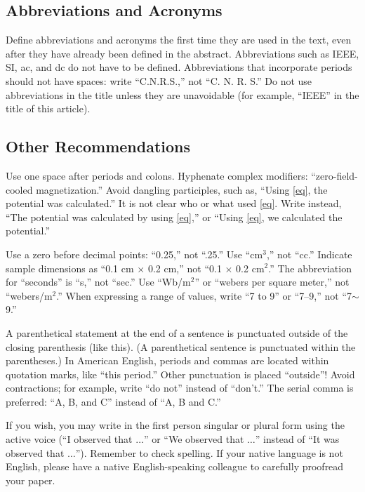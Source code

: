 \documentclass[journal,twoside,web]{ieeecolor}
\begin{document}
\subsection{Abbreviations and Acronyms}
Define abbreviations and acronyms the first time they are used in the text,
even after they have already been defined in the abstract. Abbreviations
such as IEEE, SI, ac, and dc do not have to be defined. Abbreviations that
incorporate periods should not have spaces: write ``C.N.R.S.,'' not ``C. N.
R. S.'' Do not use abbreviations in the title unless they are unavoidable
(for example, ``IEEE'' in the title of this article).

\subsection{Other Recommendations}
Use one space after periods and colons. Hyphenate complex modifiers:
``zero-field-cooled magnetization.'' Avoid dangling participles, such as,
``Using \eqref{eq}, the potential was calculated.'' It is not clear who or what
used \eqref{eq}. Write instead, ``The potential was calculated by using \eqref{eq},'' or
``Using \eqref{eq}, we calculated the potential.''

Use a zero before decimal points: ``0.25,'' not ``.25.'' Use
``cm$^{3}$,'' not ``cc.'' Indicate sample dimensions as ``0.1 cm
$\times $ 0.2 cm,'' not ``0.1 $\times $ 0.2 cm$^{2}$.'' The
abbreviation for ``seconds'' is ``s,'' not ``sec.'' Use
``Wb/m$^{2}$'' or ``webers per square meter,'' not
``webers/m$^{2}$.'' When expressing a range of values, write ``7 to
9'' or ``7--9,'' not ``7$\sim $9.''

A parenthetical statement at the end of a sentence is punctuated outside of
the closing parenthesis (like this). (A parenthetical sentence is punctuated
within the parentheses.) In American English, periods and commas are located within
quotation marks, like ``this period.'' Other punctuation is placed ``outside''!
Avoid contractions; for example, write ``do not'' instead of ``don't.'' The
serial comma is preferred: ``A, B, and C'' instead of ``A, B and C.''

If you wish, you may write in the first person singular or plural form using
the active voice (``I observed that $\ldots$'' or ``We observed that $\ldots$''
instead of ``It was observed that $\ldots$''). Remember to check spelling. If
your native language is not English, please have a native English-speaking
colleague to carefully proofread your paper.
\end{document}
